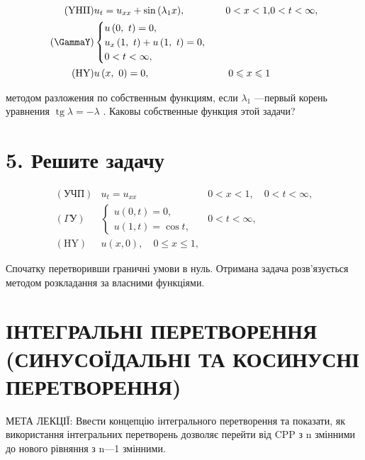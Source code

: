 \documentclass[
  ukrainian,
]{article}
\begin{document}
\[
\begin{aligned} (\text{YHII}) & u_t = u_{xx} + \sin{(\lambda_1 x)}, & 0 < x < 1, & 0 <t < \infty, \\ (\text{\GammaY}) & \begin{cases} u\left(0, \ t\right) = 0, \\ u_x\left(1, \ t\right) + u\left(1, \ t\right) = 0, \\ 0 < t < \infty, \end{cases} \\ (\text{HY}) & u\left(x, \ 0\right) = 0, & 0 \leqslant x \leqslant 1 \end{aligned}
\]

методом разложения по собственным функциям, если \(\lambda_1\) ---первый
корень уравнения \(\operatorname{tg} \lambda = -\lambda\) . Каковы
собственные функция этой задачи?

\section{5. Решите
задачу}\label{ux440ux435ux448ux438ux442ux435-ux437ux430ux434ux430ux447ux443}

\[
\begin{aligned} (\text{УЧП}) & u_t = u_{xx} & 0 < x < 1, \quad 0 < t < \infty, \\ (\Gamma \text{У}) & \begin{cases} u(0, t) = 0, \\ u(1, t) = \cos t, \end{cases} & 0 < t < \infty, \\ (\text{HY}) & u(x, 0), \quad 0 \leqslant x \leqslant 1, \end{aligned}
\]

Спочатку перетворивши граничні умови в нуль. Отримана задача
розв'язується методом розкладання за власними функціями.

\section{ІНТЕГРАЛЬНІ ПЕРЕТВОРЕННЯ (СИНУСОЇДАЛЬНІ ТА КОСИНУСНІ
ПЕРЕТВОРЕННЯ)}\label{ux456ux43dux442ux435ux433ux440ux430ux43bux44cux43dux456-ux43fux435ux440ux435ux442ux432ux43eux440ux435ux43dux43dux44f-ux441ux438ux43dux443ux441ux43eux457ux434ux430ux43bux44cux43dux456-ux442ux430-ux43aux43eux441ux438ux43dux443ux441ux43dux456-ux43fux435ux440ux435ux442ux432ux43eux440ux435ux43dux43dux44f}

МЕТА ЛЕКЦІЇ: Ввести концепцію інтегрального перетворення та показати, як
використання інтегральних перетворень дозволяє перейти від CPP з n
змінними до нового рівняння з n---1 змінними.
\end{document}
